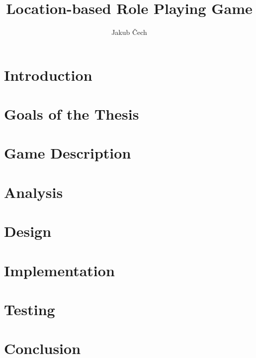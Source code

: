 \documentclass[thesis=B,english]{FITthesis}[2012/10/20]
\title{Location-based Role Playing Game}
\author{Jakub Čech} %
\begin{document}
	
	\chapter{Introduction}
		
	
	\chapter{Goals of the Thesis}
	
		
	\chapter{Game Description}
	
	
	\chapter{Analysis}
	
	
	\chapter{Design}
	
	
	\chapter{Implementation}
	
	
	\chapter{Testing}
	
	
	\chapter{Conclusion}
	
	
	\printbibliography
	
	\appendix
	
\end{document}
